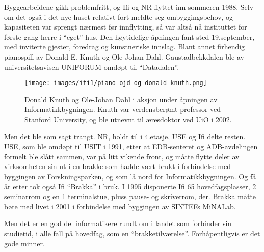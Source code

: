 Byggearbeidene gikk problemfritt, og Ifi og NR flyttet inn sommeren 1988. Selv om det også i det nye huset relativt fort meldte seg ombyggingsbehov, og kapasiteten var sprengt nærmest før innflytting, så var altså nå instituttet for første gang herre i ``eget'' hus. Den høytidelige åpningen fant sted 19.september, med inviterte gjester, foredrag og kunstneriske innslag. Blant annet firhendig pianospill av Donald E. Knuth og Ole-Johan Dahl. Gaustadbekkdalen ble av universitetsavisen UNIFORUM omdøpt til ``Datadalen''.

\begin{figure}
	\texttt{[image: images/ifi1/piano-ojd-og-donald-knuth.png]}
	\caption{Donald Knuth og Ole-Johan Dahl i aksjon under åpningen av Informatikkbygningen. Knuth var verdensberømt professor ved Stanford University, og ble utnevnt til æresdoktor ved UiO i 2002.}
\end{figure}

Men det ble som sagt trangt. NR, holdt til i 4.etasje, USE og Ifi delte resten. USE, som ble omdøpt til USIT i 1991, etter at EDB-senteret og ADB-avdelingen formelt ble slått sammen, var på litt vikende front, og måtte flytte deler av virksomheten sin ut i en brakke som hadde vært brukt i forbindelse med byggingen av Forskningsparken, og som lå nord for Informatikkbygningen. Og få år etter tok også Ifi ``Brakka'' i bruk. I 1995 disponerte Ifi 65 hovedfagsplasser, 2 seminarrom og en 1 terminalstue, pluss pause- og skriverrom, der. Brakka måtte bøte med livet i 2001 i forbindelse med byggingen av SINTEFs MiNALab.

Men det er en god del informatikere rundt om i landet som forbinder sin studietid, i alle fall på hovedfag, som en ``brakketilværelse''. Forhåpentligvis er det gode minner.
